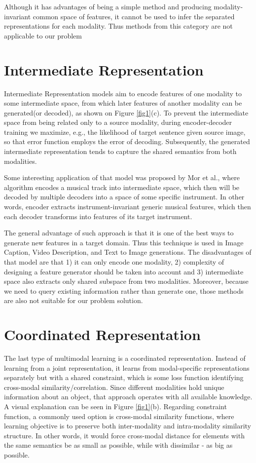 Although it has advantages of being a simple method and producing modality-invariant common space of features, it cannot be used to infer the separated representations for each modality\cite{ref_survey}. Thus methods from this category are not applicable to our problem

\section{Intermediate Representation}
Intermediate Representation models aim to encode features of one modality to some intermediate space, from which later features of another modality can be generated(or decoded), as shown on Figure \ref{fig1}(c). To prevent the intermediate space from being related only to a source modality, during encoder-decoder training we maximize, e.g., the likelihood of target sentence given source image, so that error function employs the error of decoding. Subsequently, the generated intermediate representation tends to capture the shared semantics from both modalities\cite{ref_survey}. 

Some interesting application of that model was proposed by Mor et al.\cite{ref_music_decoder}, where algorithm encodes a musical track into intermediate space, which then will be decoded by multiple decoders into a space of some specific instrument. In other words, encoder extracts instrument-invariant generic musical features, which then each decoder transforms into features of its target instrument.

The general advantage of such approach is that it is one of the best ways to generate new features in a target domain. Thus this technique is used in Image Caption\cite{ref_image_caption}, Video Description\cite{ref_video_description}, and Text to Image\cite{ref_text2image} generations. The disadvantages of that model are that 1) it can only encode one modality, 2) complexity of designing a feature generator should be taken into account\cite{ref_survey} and 3) intermediate space also extracts only shared subspace from two modalities. Moreover, because we need to query existing information rather than generate one, those methods are also not suitable for our problem solution.

\section{Coordinated Representation}
The last type of multimodal learning is a coordinated representation. Instead of learning from a joint representation, it learns from modal-specific representations separately but with a shared constraint, which is some loss function identifying cross-modal similarity/correlation. Since different modalities hold unique information about an object, that approach operates with all available knowledge. A visual explanation can be seen in Figure \ref{fig1}(b). Regarding constraint function, a commonly used option is cross-modal similarity functions, where learning objective is to preserve both inter-modality and intra-modality similarity structure. In other words, it would force cross-modal distance for elements with the same semantics be as small as possible, while with dissimilar - as big as possible. 

